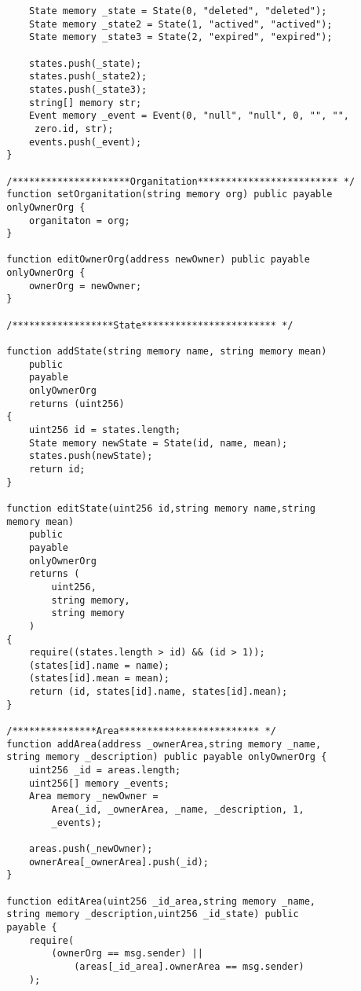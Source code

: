 \begin{verbatim}
            State memory _state = State(0, "deleted", "deleted");
            State memory _state2 = State(1, "actived", "actived");
            State memory _state3 = State(2, "expired", "expired");
    
            states.push(_state);
            states.push(_state2);
            states.push(_state3);
            string[] memory str;
            Event memory _event = Event(0, "null", "null", 0, "", "",
             zero.id, str);
            events.push(_event);
        }
    
        /*********************Organitation************************* */
        function setOrganitation(string memory org) public payable 
        onlyOwnerOrg {
            organitaton = org;
        }
    
        function editOwnerOrg(address newOwner) public payable 
        onlyOwnerOrg {
            ownerOrg = newOwner;
        }
    
        /******************State************************ */
    
        function addState(string memory name, string memory mean)
            public
            payable
            onlyOwnerOrg
            returns (uint256)
        {
            uint256 id = states.length;
            State memory newState = State(id, name, mean);
            states.push(newState);
            return id;
        }
    
        function editState(uint256 id,string memory name,string 
        memory mean)
            public
            payable
            onlyOwnerOrg
            returns (
                uint256,
                string memory,
                string memory
            )
        {
            require((states.length > id) && (id > 1));
            (states[id].name = name);
            (states[id].mean = mean);
            return (id, states[id].name, states[id].mean);
        }
    
        /***************Area************************* */
        function addArea(address _ownerArea,string memory _name,
        string memory _description) public payable onlyOwnerOrg {
            uint256 _id = areas.length;
            uint256[] memory _events;
            Area memory _newOwner =
                Area(_id, _ownerArea, _name, _description, 1, 
                _events);
    
            areas.push(_newOwner);
            ownerArea[_ownerArea].push(_id);
        }
    
        function editArea(uint256 _id_area,string memory _name,
        string memory _description,uint256 _id_state) public 
        payable {
            require(
                (ownerOrg == msg.sender) ||
                    (areas[_id_area].ownerArea == msg.sender)
            );
    

\end{verbatim}
